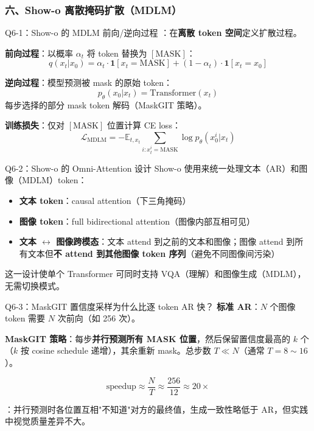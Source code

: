 \subsubsection{六、Show-o 离散掩码扩散（MDLM）}

\begin{conceptbox}{Q6-1：Show-o 的 MDLM 前向/逆向过程}
：在\textbf{离散 token 空间}定义扩散过程。

\textbf{前向过程}：以概率 $\alpha_t$ 将 token 替换为 $[\text{MASK}]$：
\[
q(x_t | x_0) = \alpha_t \cdot \mathbf{1}[x_t = \text{MASK}] + (1-\alpha_t) \cdot \mathbf{1}[x_t = x_0]
\]

\textbf{逆向过程}：模型预测被 mask 的原始 token：
\[
p_\theta(x_0 | x_t) = \text{Transformer}(x_t)
\]
每步选择的部分 mask token 解码（MaskGIT 策略）。

\textbf{训练损失}：仅对 $[\text{MASK}]$ 位置计算 CE loss：
\[
\mathcal{L}_{\text{MDLM}} = -\mathbb{E}_{t, x_t} \sum_{i: x_t^i = \text{MASK}} \log p_\theta(x_0^i | x_t)
\]
\end{conceptbox}

\begin{conceptbox}{Q6-2：Show-o 的 Omni-Attention 设计}
Show-o 使用来统一处理文本（AR）和图像（MDLM）token：
\begin{itemize}
  \item \textbf{文本 token}：causal attention（下三角掩码）
  \item \textbf{图像 token}：full bidirectional attention（图像内部互相可见）
  \item \textbf{文本 $\leftrightarrow$ 图像跨模态}：文本 attend 到之前的文本和图像；图像 attend 到所有文本但\textbf{不 attend 到其他图像 token 序列}（避免不同图像间污染）
\end{itemize}

这一设计使单个 Transformer 可同时支持 VQA（理解）和图像生成（MDLM），无需切换模式。
\end{conceptbox}

\begin{conceptbox}{Q6-3：MaskGIT 置信度采样为什么比逐 token AR 快？}
\textbf{标准 AR}：$N$ 个图像 token 需要 $N$ 次前向（如 256 次）。

\textbf{MaskGIT 策略}：每步\textbf{并行预测所有 MASK 位置}，然后保留置信度最高的 $k$ 个（$k$ 按 cosine schedule 递增），其余重新 mask。总步数 $T \ll N$（通常 $T = 8 \sim 16$）。

\[
\text{speedup} \approx \frac{N}{T} \approx \frac{256}{12} \approx 20\times
\]

：并行预测时各位置互相"不知道"对方的最终值，生成一致性略低于 AR，但实践中视觉质量差异不大。
\end{conceptbox}

